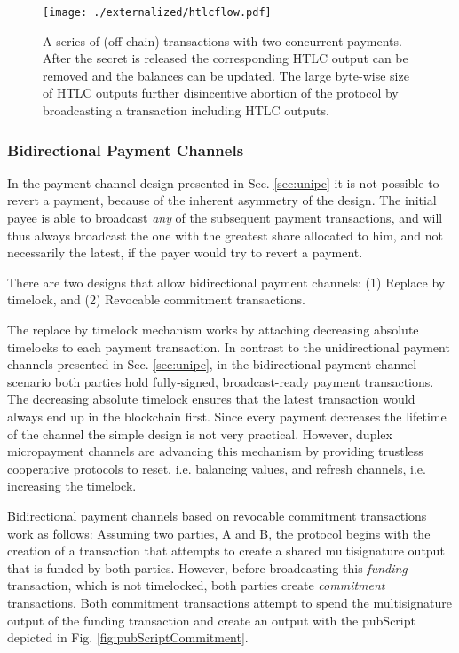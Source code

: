 \begin{figure}
\centering
\texttt{[image: ./externalized/htlcflow.pdf]}
\caption{A series of (off-chain) transactions with two concurrent payments. After the secret is released the corresponding HTLC output can be removed and the balances can be updated. The large byte-wise size of HTLC outputs further disincentive abortion of the protocol by broadcasting a transaction including HTLC outputs.}
\label{fig:htlcflow}
\end{figure}

\subsubsection{Bidirectional Payment Channels}

In the payment channel design presented in Sec. \ref{sec:unipc} it is not possible to revert a payment, because of the inherent asymmetry of the design. The initial payee is able to broadcast \emph{any} of the subsequent payment transactions, and will thus always broadcast the one with the greatest share allocated to him, and not necessarily the latest, if the payer would try to revert a payment. 

There are two designs that allow bidirectional payment channels: (1) Replace by timelock, and (2) Revocable commitment transactions.

The replace by timelock mechanism works by attaching decreasing absolute timelocks to each payment transaction. In contrast to the unidirectional payment channels presented in Sec. \ref{sec:unipc}, in the bidirectional payment channel scenario both parties hold fully-signed, broadcast-ready payment transactions. The decreasing absolute timelock ensures that the latest transaction would always end up in the blockchain first. Since every payment decreases the lifetime of the channel the simple design is not very practical. However, duplex micropayment channels are advancing this mechanism by providing trustless cooperative protocols to reset, i.e. balancing values, and refresh channels, i.e. increasing the timelock. 

Bidirectional payment channels based on revocable commitment transactions work as follows:
Assuming two parties, A and B, the protocol begins with the creation of a transaction that attempts to create a shared multisignature output that is funded by both parties. However, before broadcasting this \emph{funding} transaction, which is not timelocked, both parties create \emph{commitment} transactions. Both commitment transactions attempt to spend the multisignature output of the funding transaction and create an output with the pubScript depicted in Fig. \ref{fig:pubScriptCommitment}.


